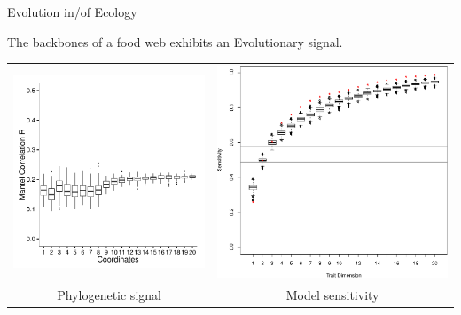\documentclass[]{beamer}
\begin{document}
\begin{frame}{Evolution in/of Ecology}

The backbones of a food web exhibits an Evolutionary signal.

\centering
\begin{tabular}{cc}
\includegraphics[width=0.4\linewidth]{images/psig.pdf} & \includegraphics[width=0.4 \linewidth]{images/sens.pdf}\\
{\tiny Phylogenetic signal} & {\tiny Model sensitivity}
\end{tabular}



\end{frame}
\end{document}

